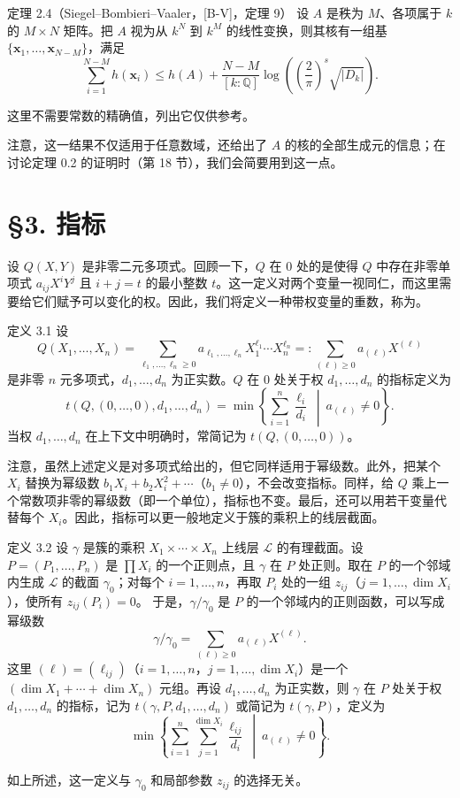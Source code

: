 \begin{statement}{定理 2.4（Siegel--Bombieri--Vaaler，[B-V]，定理 9）}
设 $A$ 是秩为 $M$、各项属于 $k$ 的 $M\times N$ 矩阵。把 $A$ 视为从 $k^N$ 到 $k^M$ 的线性变换，则其核有一组基 $\{\boldsymbol x_1,\ldots,\boldsymbol x_{N-M}\}$，满足
\[
\sum_{i=1}^{N-M}h(\boldsymbol x_i)
\le h(A)+\frac{N-M}{[k:\mathbb Q]}
\log\left(\left(\frac2\pi\right)^s\sqrt{|D_k|}\right).
\]
\end{statement}
这里不需要常数的精确值，列出它仅供参考。

注意，这一结果不仅适用于任意数域，还给出了 $A$ 的核的全部生成元的信息；在讨论定理 0.2 的证明时（第 18 节），我们会简要用到这一点。

\section*{§3. 指标}
设 $Q(X,Y)$ 是非零二元多项式。回顾一下，$Q$ 在 $0$ 处的是使得 $Q$ 中存在非零单项式 $a_{ij}X^iY^j$ 且 $i+j=t$ 的最小整数 $t$。这一定义对两个变量一视同仁，而这里需要给它们赋予可以变化的权。因此，我们将定义一种带权变量的重数，称为。
\begin{statement}{定义 3.1}
设
\[
Q(X_1,\ldots,X_n)=
\sum_{\ell_1,\ldots,\ell_n\ge0}a_{\ell_1,\ldots,\ell_n}X_1^{\ell_1}\cdots X_n^{\ell_n}
=:\sum_{(\ell)\ge0}a_{(\ell)}X^{(\ell)}
\]
是非零 $n$ 元多项式，$d_1,\ldots,d_n$ 为正实数。$Q$ 在 $0$ 处关于权 $d_1,\ldots,d_n$ 的指标定义为
\[
t(Q,(0,\ldots,0),d_1,\ldots,d_n)
=\min\left\{\sum_{i=1}^n\frac{\ell_i}{d_i}\ \middle|\ a_{(\ell)}\ne0\right\}.
\]
当权 $d_1,\ldots,d_n$ 在上下文中明确时，常简记为 $t(Q,(0,\ldots,0))$。
\end{statement}
注意，虽然上述定义是对多项式给出的，但它同样适用于幂级数。此外，把某个 $X_i$ 替换为幂级数 $b_1X_i+b_2X_i^2+\cdots$（$b_1\ne0$），不会改变指标。同样，给 $Q$ 乘上一个常数项非零的幂级数（即一个单位），指标也不变。最后，还可以用若干变量代替每个 $X_i$。因此，指标可以更一般地定义于簇的乘积上的线层截面。
\begin{statement}{定义 3.2}
设 $\gamma$ 是簇的乘积 $X_1\times\cdots\times X_n$ 上线层 $\mathscr L$ 的有理截面。设 $P=(P_1,\ldots,P_n)$ 是 $\prod X_i$ 的一个正则点，且 $\gamma$ 在 $P$ 处正则。取在 $P$ 的一个邻域内生成 $\mathscr L$ 的截面 $\gamma_0$；对每个 $i=1,\ldots,n$，再取 $P_i$ 处的一组 $z_{ij}$（$j=1,\ldots,\dim X_i$），使所有 $z_{ij}(P_i)=0$。
于是，$\gamma/\gamma_0$ 是 $P$ 的一个邻域内的正则函数，可以写成幂级数
\[
\gamma/\gamma_0=\sum_{(\ell)\ge0}a_{(\ell)}X^{(\ell)}.
\]
这里 $(\ell)=(\ell_{ij})$（$i=1,\ldots,n$，$j=1,\ldots,\dim X_i$）是一个 $(\dim X_1+\cdots+\dim X_n)$ 元组。再设 $d_1,\ldots,d_n$ 为正实数，则 $\gamma$ 在 $P$ 处关于权 $d_1,\ldots,d_n$ 的指标，记为 $t(\gamma,P,d_1,\ldots,d_n)$ 或简记为 $t(\gamma,P)$，定义为
\[
\min\left\{\sum_{i=1}^n\sum_{j=1}^{\dim X_i}\frac{\ell_{ij}}{d_i}\ \middle|\ a_{(\ell)}\ne0\right\}.
\]
\end{statement}
如上所述，这一定义与 $\gamma_0$ 和局部参数 $z_{ij}$ 的选择无关。

